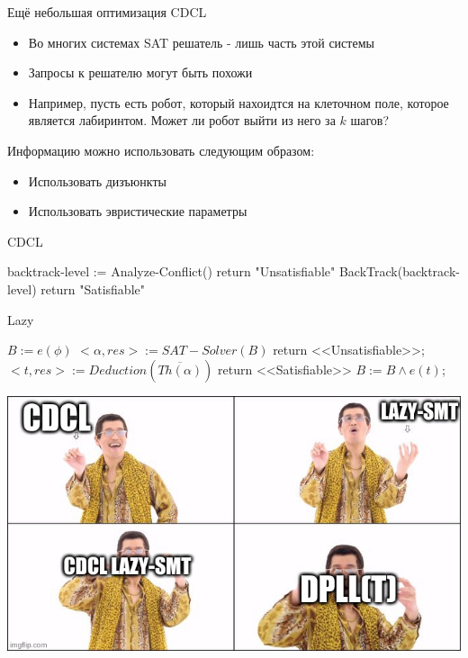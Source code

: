 \documentclass{beamer}
\begin{document}
\begin{frame}{Ещё небольшая оптимизация CDCL}
\begin{itemize}
\item Во многих системах SAT решатель - лишь часть этой системы
\item Запросы к решателю могут быть похожи
\item Например, пусть есть робот, который нахоидтся на клеточном поле, которое является лабиринтом. Может ли робот выйти из него
за $k$ шагов?
\end{itemize}
Информацию можно использовать следующим образом:
\begin{itemize}
\item Использовать дизъюнкты
\item Использовать эвристические параметры
\end{itemize}
\end{frame}

\begin{frame}{CDCL}
\begin{algorithmic}
            \State backtrack-level := Analyze-Conflict()
                \State return "Unsatisfiable"
            \EndIf
            \State BackTrack(backtrack-level)
                \State return "Satisfiable"
            \EndIf
        \EndWhile
    \EndWhile
\EndFunction
\end{algorithmic}
\end{frame}

\begin{frame}{Lazy}
\begin{algorithmic}
    \State $B := e(\phi)$
        \State $<\alpha, res> := SAT-Solver(B)$
            \State return <<Unsatisfiable>>;
        \Else
            \State $<t, res> := Deduction(\overline{Th(\alpha)})$
                \State return <<Satisfiable>>
            \EndIf
            \State $B := B \wedge e(t)$;
        \EndIf
    \EndWhile
\EndFunction
\end{algorithmic}
\end{frame}

\begin{frame}
\includegraphics[scale=0.45]{pineapple}
\end{frame}
\end{document}
